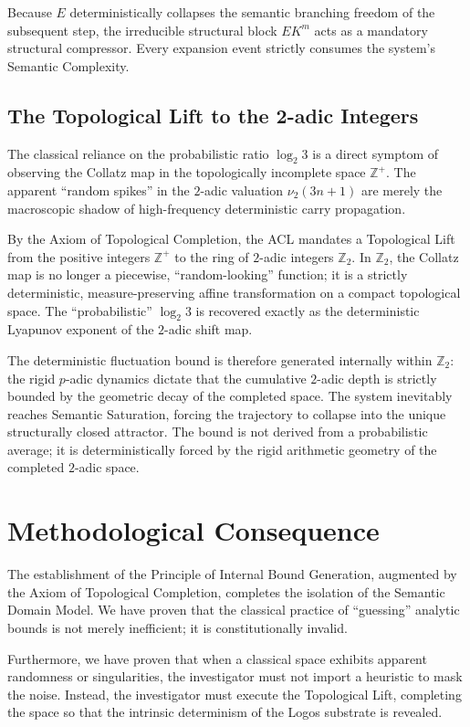 \documentclass[12pt,openany]{extbook}
\theoremstyle{plain}
\theoremstyle{definition}
\begin{document}
Because $E$ deterministically collapses the semantic branching freedom of the subsequent step, the irreducible structural block $EK^m$ acts as a mandatory structural compressor. Every expansion event strictly consumes the system's Semantic Complexity.

\subsection{The Topological Lift to the 2-adic Integers}
The classical reliance on the probabilistic ratio $\log_2 3$ is a direct symptom of observing the Collatz map in the topologically incomplete space $\mathbb{Z}^+$. The apparent ``random spikes'' in the $2$-adic valuation $\nu_2(3n+1)$ are merely the macroscopic shadow of high-frequency deterministic carry propagation.

By the Axiom of Topological Completion, the ACL mandates a Topological Lift from the positive integers $\mathbb{Z}^+$ to the ring of $2$-adic integers $\mathbb{Z}_2$. In $\mathbb{Z}_2$, the Collatz map is no longer a piecewise, ``random-looking'' function; it is a strictly deterministic, measure-preserving affine transformation on a compact topological space. The ``probabilistic'' $\log_2 3$ is recovered exactly as the deterministic Lyapunov exponent of the $2$-adic shift map.

The deterministic fluctuation bound is therefore generated internally within $\mathbb{Z}_2$: the rigid $p$-adic dynamics dictate that the cumulative $2$-adic depth is strictly bounded by the geometric decay of the completed space. The system inevitably reaches Semantic Saturation, forcing the trajectory to collapse into the unique structurally closed attractor. The bound is not derived from a probabilistic average; it is deterministically forced by the rigid arithmetic geometry of the completed $2$-adic space.

\section{Methodological Consequence}

The establishment of the Principle of Internal Bound Generation, augmented by the Axiom of Topological Completion, completes the isolation of the Semantic Domain Model. We have proven that the classical practice of ``guessing'' analytic bounds is not merely inefficient; it is constitutionally invalid.

Furthermore, we have proven that when a classical space exhibits apparent randomness or singularities, the investigator must not import a heuristic to mask the noise. Instead, the investigator must execute the Topological Lift, completing the space so that the intrinsic determinism of the Logos substrate is revealed.
\end{document}
